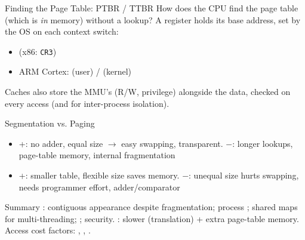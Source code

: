 \multend

\begin{corollary}{Finding the Page Table: PTBR / TTBR}
    How does the CPU find the page table (which is \emph{in} memory) without a lookup?
    A register holds its  base address, set by the OS on each
    context switch:
    \begin{itemize}
        \item {} (x86: \texttt{CR3})
        \item ARM Cortex:  (user) /  (kernel)
    \end{itemize}
    Caches also store the MMU's  (R/W, privilege) alongside
    the data, checked on every access (and for inter-process isolation).
\end{corollary}


\begin{definition}{Segmentation vs. Paging}
    \begin{itemize}
        \item {} +: no adder, equal size $\to$ easy swapping,
              transparent. $-$: longer lookups, page-table memory, internal fragmentation
        \item {} +: smaller table, flexible size saves memory.
              $-$: unequal size hurts swapping, needs programmer effort, adder/comparator
    \end{itemize}
\end{definition}

\begin{remark2}{Summary}
    : contiguous appearance despite fragmentation; process
    ; shared maps for multi-threading; ; security. : slower (translation) + extra
    page-table memory. Access cost factors: , , .
\end{remark2}

\multend

\raggedcolumns
